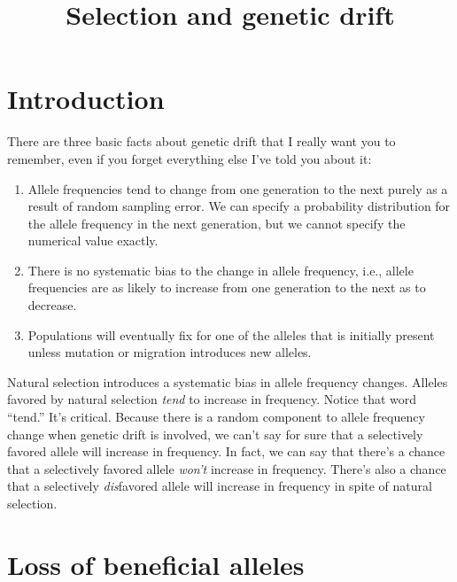 \documentclass[12pt]{article}
\title{Selection and genetic drift}
\begin{document}
\maketitle

\thispagestyle{first}

\section*{Introduction}

There are three basic facts about genetic drift that I really want you
to remember, even if you forget everything else I've told you about
it:

\begin{enumerate}

\item Allele frequencies tend to change from one generation to the
next purely as a result of random sampling error. We can specify a
probability distribution for the allele frequency in the next
generation, but we cannot specify the numerical value exactly.

\item There is no systematic bias to the change in allele frequency,
i.e., allele frequencies are as likely to increase from one generation
to the next as to decrease.

\item Populations will eventually fix for one of the alleles that is
initially present unless mutation or migration introduces new
alleles. 

\end{enumerate}

Natural selection introduces a systematic bias in allele frequency
changes. Alleles favored by natural selection {\it tend\/} to increase
in frequency. Notice that word ``tend.'' It's critical. Because there
is a random component to allele frequency change when genetic drift is
involved, we can't say for sure that a selectively favored allele will
increase in frequency. In fact, we can say that there's a chance that
a selectively favored allele {\it won't\/} increase in
frequency. There's also a chance that a selectively {\it dis\/}favored
allele will increase in frequency in spite of natural selection.

\section*{Loss of beneficial alleles}
\end{document}
